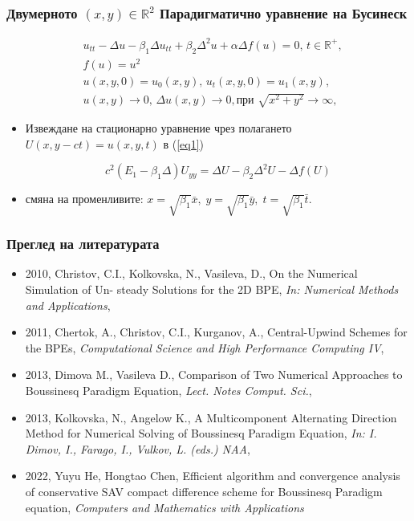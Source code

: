 \documentclass{beamer}
\newcommand{\RR}{\mathbb{R}}
\newcommand{\rf}[1]{(\ref{#1})}
\begin{document}
\begin{frame}
\frametitle{ Двумерното $(x,y) \in \RR^2$ Парадигматично уравнение на Бусинеск }
\begin{align}
&u_{tt} - \Delta u -\beta_1  \Delta u_{tt} +\beta_2 \Delta ^2 u +\alpha \Delta f(u)=0, \, t\in\RR^+,\label{eq1}
\\
&f(u) =  u^2 \nonumber \\  \nonumber &u(x,y,0)=u_0(x,y), \, u_t(x,y,0)=u_1(x,y)  , 
\\  &u(x,y) \rightarrow 0, \,  \Delta u(x,y) \rightarrow 0 ,  \text {при } \sqrt{x^2 + y^2} \rightarrow \infty, \label{eq11} 
\end{align}

\begin{itemize}

  \item Извеждане на {\color{red}стационарно} уравнение чрез полагането $U(x,y-ct)=u(x,y,t)$ в \rf{eq1}

{\color{red}
\begin{equation}
c^2 (E_1-\beta_1 \Delta) U_{yy} = \Delta U -\beta_2 \Delta^2 U - \Delta f(U)
\end{equation}
}%
  \item смяна на променливите:
$
x = \sqrt{\beta_1} \bar{x}, \; y = \sqrt{\beta_1} \bar{y}, \; t = \sqrt{\beta_1} \bar{t}.
$
\end{itemize}
\end{frame}


\begin{frame}
\frametitle{Преглед на литературата}

\begin{itemize}
  \item 2010, Christov, C.I., Kolkovska, N., Vasileva, D., On the Numerical Simulation of Un-
steady Solutions for the 2D BPE, {\it In: Numerical Methods and Applications},

  \item 2011, Chertok, A., Christov, C.I., Kurganov, A., Central-Upwind Schemes for the BPEs,
{\it Computational Science and High Performance Computing IV},

  \item 2013, Dimova M., Vasileva D., Comparison of Two Numerical Approaches to Boussinesq Paradigm Equation,  {\it Lect. Notes Comput. Sci.}, 

  \item 2013, Kolkovska, N., Angelow K., A Multicomponent Alternating Direction Method for Numerical Solving of Boussinesq Paradigm Equation, {\it In:  I. Dimov, I., Farago, I., Vulkov, L. (eds.) NAA},
    
  \item 2022, Yuyu He, Hongtao Chen, Efficient algorithm and convergence analysis of conservative SAV compact difference scheme for Boussinesq Paradigm equation, {\it Computers and Mathematics with Applications}
\end{itemize}

\end{frame}
\end{document}
